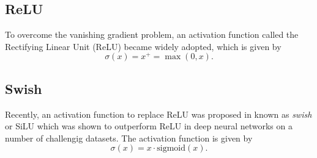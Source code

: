 \subsection{ReLU}
To overcome the vanishing gradient problem, an activation function called the Rectifying Linear Unit (ReLU) became widely adopted, which is given by
\begin{equation}
    \sigma(x) = x^+ = \max(0, x).
\end{equation}


\subsection{Swish}
Recently, an activation function to replace ReLU was proposed in \cite{swish} known as \textit{swish} or SiLU which was shown to outperform ReLU in deep neural networks on
a number of challengig datasets. The activation function is given by
\begin{equation}
    \sigma(x) = x\cdot \text{sigmoid}(x).
\end{equation}


